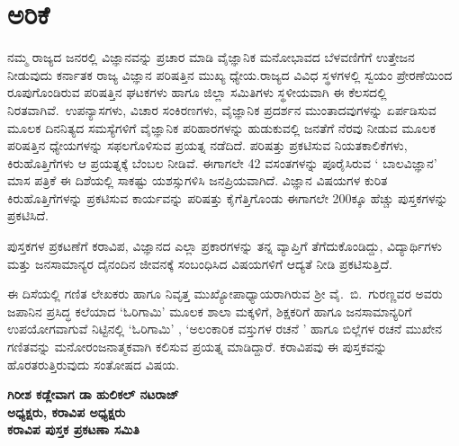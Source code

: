 

\chapter*{ಅರಿಕೆ}

\vspace{-1cm}

ನಮ್ಮ ರಾಜ್ಯದ ಜನರಲ್ಲಿ ವಿಜ್ಞಾನವನ್ನು ಪ್ರಚಾರ ಮಾಡಿ ವೈಜ್ಞಾನಿಕ ಮನೋಭಾವದ ಬೆಳ\break ವಣಿಗೆಗೆ ಉತ್ತೇಜನ ನೀಡುವುದು  ಕರ್ನಾತಕ ರಾಜ್ಯ ವಿಜ್ಞಾನ ಪರಿಷತ್ತಿನ ಮುಖ್ಯ ಧ್ಯೇಯ.\break ರಾಜ್ಯದ ವಿವಿಧ ಸ್ಥಳಗಳಲ್ಲಿ ಸ್ವಯಂ ಪ್ರೇರಣೆಯಿಂದ ರೂಪುಗೊಂಡಿರುವ ಪರಿಷತ್ತಿನ  ಘಟಕ\break ಗಳು ಹಾಗೂ ಜಿಲ್ಲಾ ಸಮಿತಿಗಳು ಸ್ಥಳೀಯವಾಗಿ ಈ ಕೆಲಸದಲ್ಲಿ ನಿರತವಾಗಿವೆ.~ಉಪನ್ಯಾಸಗಳು, ವಿಚಾರ ಸಂಕಿರಣಗಳು, ವೈಜ್ಞಾನಿಕ ಪ್ರದರ್ಶನ ಮುಂತಾದವುಗಳನ್ನು ಏರ್ಪಡಿಸುವ ಮೂಲಕ ದಿನನಿತ್ಯದ ಸಮಸ್ಯೆಗಳಿಗೆ ವೈಜ್ಞಾನಿಕ ಪರಿಹಾರಗಳನ್ನು ಹುಡುಕುವಲ್ಲಿ ಜನತೆಗೆ ನೆರವು ನೀಡುವ ಮೂಲಕ ಪರಿಷತ್ತಿನ ಧ್ಯೇಯಗಳನ್ನು ಸಫಲಗೊಳಿಸುವ ಪ್ರಯತ್ನ ನಡೆದಿದೆ. ಪರಿಷತ್ತು ಪ್ರಕಟಿಸುವ ನಿಯತಕಾಲಿಕೆಗಳು, ಕಿರುಹೊತ್ತಿಗೆಗಳು ಆ ಪ್ರಯತ್ನಕ್ಕೆ ಬೆಂಬಲ ನೀಡಿವೆ. ಈಗಾ\break ಗಲೇ 42 ವಸಂತಗಳನ್ನು ಪೂರೈಸಿರುವ ` ಬಾಲವಿಜ್ಞಾನ' ಮಾಸ ಪತ್ರಿಕೆ ಈ ದಿಶೆಯಲ್ಲಿ ಸಾಕಷ್ಟು ಯಶಸ್ಸುಗಳಿಸಿ ಜನಪ್ರಿಯವಾಗಿದೆ. ವಿಜ್ಞಾನ ವಿಷಯಗಳ ಕುರಿತ ಕಿರುಹೊತ್ತಿಗೆಗಳನ್ನು ಪ್ರಕಟಿಸುವ ಕಾರ್ಯವನ್ನು ಪರಿಷತ್ತು ಕೈಗೆತ್ತಿಗೊಂಡು ಈಗಾಗಲೇ 200ಕ್ಕೂ ಹೆಚ್ಚು ಪುಸ್ತಕಗಳನ್ನು ಪ್ರಕಟಿಸಿದೆ.

ಪುಸ್ತಕಗಳ ಪ್ರಕಟಣೆಗೆ ಕರಾವಿಪ, ವಿಜ್ಞಾನದ ಎಲ್ಲಾ ಪ್ರಕಾರಗಳನ್ನು ತನ್ನ ವ್ಯಾಪ್ತಿಗೆ ತೆಗೆದುಕೊಂಡಿದ್ದು, ವಿದ್ಯಾರ್ಥಿಗಳು ಮತ್ತು ಜನಸಾಮಾನ್ಯರ ದೈನಂದಿನ ಜೀವನಕ್ಕೆ ಸಂಬಂಧಿಸಿದ ವಿಷಯಗಳಿಗೆ ಆದ್ಯತೆ ನೀಡಿ ಪ್ರಕಟಿಸುತ್ತಿದೆ.

ಈ ದಿಸೆಯಲ್ಲಿ ಗಣಿತ ಲೇಖಕರು ಹಾಗೂ ನಿವೃತ್ತ ಮುಖ್ಯೋಪಾಧ್ಯಾಯರಾಗಿರುವ ಶ್ರೀ ವೈ.~ಬಿ.~ಗುರಣ್ಣವರ ಅವರು ಜಪಾನಿನ ಪ್ರಸಿದ್ಧ ಕಲೆಯಾದ `ಓರಿಗಾಮಿ' ಮೂಲಕ ಶಾಲಾ ಮಕ್ಕಳಿಗೆ, ಶಿಕ್ಷಕರಿಗೆ ಹಾಗೂ ಜನಸಾಮಾನ್ಯರಿಗೆ ಉಪಯೋಗವಾಗುವೆ ನಿಟ್ಟಿನಲ್ಲಿ `ಓರಿಗಾಮಿ' , `ಅಲಂಕಾರಿಕ ವಸ್ತುಗಳ ರಚನೆ ' ಹಾಗೂ ಬಿಲ್ಲೆಗಳ ರಚನೆ ಮುಖೇನ ಗಣಿತವನ್ನು ಮನೋರಂಜನಾತ್ಮಕವಾಗಿ ಕಲಿಸುವ ಪ್ರಯತ್ನ ಮಾಡಿದ್ದಾರೆ. ಕರಾವಿಪವು ಈ ಪುಸ್ತಕವನ್ನು ಹೊರತರುತ್ತಿರುವುದು ಸಂತೋಷದ ವಿಷಯ. 

\noindent
\textbf{ಗಿರೀಶ ಕಡ್ಲೇವಾಗ \hfill ಡಾ ಹುಲಿಕಲ್ ನಟರಾಜ್\\[-.1cm]}
\textbf{ಅಧ್ಯಕ್ಷರು, ಕರಾವಿಪ \hfill ಅಧ್ಯಕ್ಷರು\\[-.1cm]} 
\textbf{\phantom{} \hfill ಕರಾವಿಪ ಪುಸ್ತಕ ಪ್ರಕಟಣಾ ಸಮಿತಿ}
